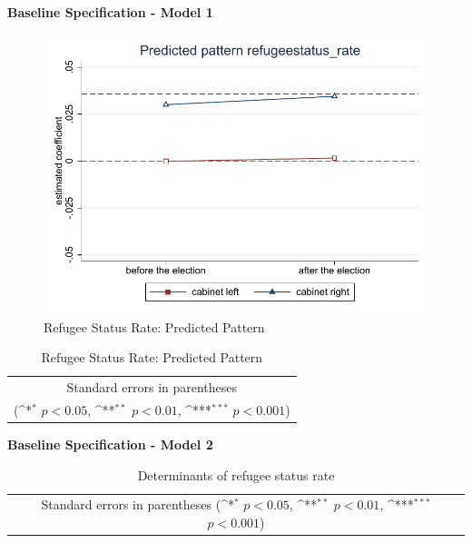 \documentclass[10pt,a4paper]{scrartcl}
\begin{document}
\clearpage
\textbf{Baseline Specification - Model 1}
\begin{figure}[!ht]
	\centering
	\includegraphics[width=1\textwidth]{figures_edited/refugeestatus_rate_graph1_baseline.pdf}
	\caption{Refugee Status Rate: Predicted Pattern}
\end{figure}

\begin{table}[!ht]\centering
	\renewcommand{\arraystretch}{1.25}
	\def\sym#1{\ifmmode^{#1}\else\(^{#1}\)\fi}
	\caption{Refugee Status Rate: Predicted Pattern}
	\begin{tabular}[]{l*{2}{c}}
		\hline\hline
		
		\hline\hline
		\multicolumn{3}{c}{\footnotesize Standard errors in parentheses} \\
		\multicolumn{3}{c}{\footnotesize (\sym{*} \(p<0.05\), \sym{**} \(p<0.01\), \sym{***} \(p<0.001\))}\\
	\end{tabular}
\end{table}

\clearpage
\textbf{Baseline Specification - Model 2}
\begin{table}[!ht]\centering
	\scriptsize
	\renewcommand{\arraystretch}{1.05}
	\def\sym#1{\ifmmode^{#1}\else\(^{#1}\)\fi}
	\caption{Determinants of refugee status rate}
	\begin{tabular}{l*{3}{c}}
		\hline\hline
		
		\hline\hline
		\multicolumn{4}{c}{\footnotesize Standard errors in parentheses (\sym{*} \(p<0.05\), \sym{**} \(p<0.01\), \sym{***} \(p<0.001\))}\\
	\end{tabular}
\end{table}
\end{document}
